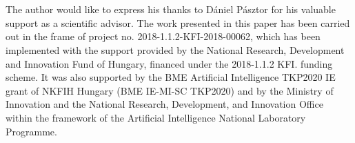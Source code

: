\chapter*{\koszonetnyilvanitas}

The author would like to express his thanks to D\'aniel P\'asztor for his valuable support as a scientific advisor. The work presented in this paper has been carried out in the frame of project no. 2018-1.1.2-KFI-2018-00062, which has been implemented with the support provided by the National Research, Development and Innovation Fund of Hungary, financed under the 2018-1.1.2 KFI. funding scheme. It was also supported by the BME Artificial Intelligence TKP2020 IE grant of NKFIH Hungary (BME IE-MI-SC TKP2020) and by the Ministry of Innovation and the National Research, Development, and Innovation Office within the framework of the Artificial Intelligence National Laboratory Programme.